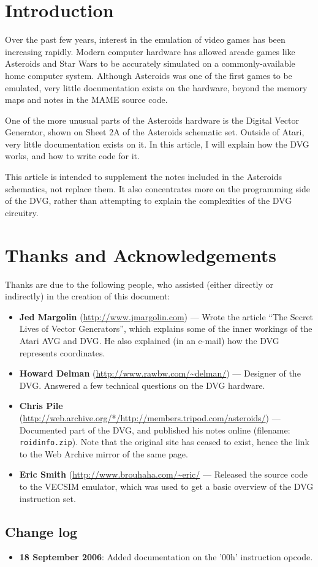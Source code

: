 \section{Introduction}
Over the past few years, interest in the emulation of video games has been
increasing rapidly. Modern computer hardware has allowed arcade games like
Asteroids and Star Wars to be accurately simulated on a commonly-available
home computer system. Although Asteroids was one of the first games to be
emulated, very little documentation exists on the hardware, beyond the memory
maps and notes in the MAME source code.

One of the more unusual parts of the Asteroids hardware is the Digital Vector
Generator, shown on Sheet 2A of the Asteroids schematic set. Outside of Atari,
very little documentation exists on it. In this article, I will explain how
the DVG works, and how to write code for it.

This article is intended to supplement the notes included in the Asteroids
schematics, not replace them. It also concentrates more on the programming side
of the DVG, rather than attempting to explain the complexities of the DVG
circuitry.

\section{Thanks and Acknowledgements}
Thanks are due to the following people, who assisted (either directly or
indirectly) in the creation of this document:

\begin{itemize}
	\item{{\bf Jed Margolin} (\url{http://www.jmargolin.com}) --- Wrote the
article ``The Secret Lives of Vector Generators'', which explains some of the
inner workings of the Atari AVG and DVG. He also explained (in an e-mail) how
the DVG represents coordinates.}

 	\item{{\bf Howard Delman} (\url{http://www.rawbw.com/~delman/}) --- Designer of
the DVG. Answered a few technical questions on the DVG hardware.}

 	\item{{\bf Chris Pile} (\url{http://web.archive.org/*/http://members.tripod.com/asteroids/}) --- Documented
part of the DVG, and published his notes online (filename: {\tt roidinfo.zip}).
Note that the original site has ceased to exist, hence the link to the Web
Archive mirror of the same page.}

 	\item{{\bf Eric Smith} (\url{http://www.brouhaha.com/~eric/} --- Released
the source code to the VECSIM emulator, which was used to get a basic overview
of the DVG instruction set.}
\end{itemize}

\subsection{Change log}
\begin{itemize}
  \item{{\bf 18 September 2006}: Added documentation on the '00h' instruction opcode.}
\end{itemize}
